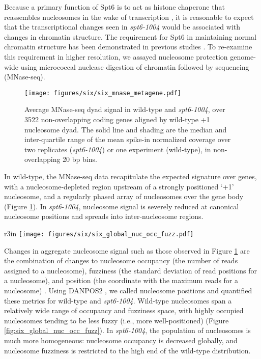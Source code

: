 Because a primary function of Spt6 is to act as histone chaperone that reassembles nucleosomes in the wake of transcription \citep{duina2011}, it is reasonable to expect that the transcriptional changes seen in \textit{spt6-1004} would be associated with changes in chromatin structure.
The requirement for Spt6 in maintaining normal chromatin structure has been demonstrated in previous studies \citep{bortvin1996, ivanovska2011, jeronimo2015, kaplan2003, perales2013, vanbakel2013, degennaro2013}.
To re-examine this requirement in higher resolution, we assayed nucleosome protection genome-wide using micrococcal nuclease digestion of chromatin followed by sequencing (MNase-seq).
\begin{figure}[h]
    \centering
    \texttt{[image: figures/six/six\_mnase\_metagene.pdf]}
    \caption[Average MNase-seq dyad signal in wild-type and \textit{spt6-1004}, over non-overlapping genes aligned by wild-type +1 nucleosome dyad.]{Average MNase-seq dyad signal in wild-type and \textit{spt6-1004}, over 3522 non-overlapping coding genes aligned by wild-type +1 nucleosome dyad. The solid line and shading are the median and inter-quartile range of the mean spike-in normalized coverage over two replicates (\textit{spt6-1004}) or one experiment (wild-type), in non-overlapping 20 bp bins.}
    \label{fig:six_mnase_metagene}
\end{figure}

In wild-type, the MNase-seq data recapitulate the expected signature over genes, with a nucleosome-depleted region upstream of a strongly positioned `+1' nucleosome, and a regularly phased array of nucleosomes over the gene body (Figure \ref{fig:six_mnase_metagene}).
In \textit{spt6-1004}, nucleosome signal is severely reduced at canonical nucleosome positions and spreads into inter-nucleosome regions.

\begin{wrapfigure}[10]{r}{3in}
    \centering
    \texttt{[image: figures/six/six\_global\_nuc\_occ\_fuzz.pdf]}
    \caption[Contour plot of nucleosome occupancy and fuzziness in wild-type and \textit{spt6-1004}.]{Contour plot of the distribution of nucleosome occupancy and fuzziness in wild-type and \textit{spt6-1004}. Dashed lines indicate median values.}
    \label{fig:six_global_nuc_occ_fuzz}
\end{wrapfigure}
Changes in aggregate nucleosome signal such as those observed in Figure \ref{fig:six_mnase_metagene} are the combination of changes to nucleosome occupancy (the number of reads assigned to a nucleosome), fuzziness (the standard deviation of read positions for a nucleosome), and position (the coordinate with the maximum reads for a nucleosome) \citep{chen2013}.
Using DANPOS2 \citep{chen2013}, we called nucleosome positions and quantified these metrics for wild-type and \textit{spt6-1004}.
Wild-type nucleosomes span a relatively wide range of occupancy and fuzziness space, with highly occupied nucleosomes tending to be less fuzzy (i.e., more well-positioned) (Figure \ref{fig:six_global_nuc_occ_fuzz}).
In \textit{spt6-1004}, the population of nucleosomes is much more homogeneous: nucleosome occupancy is decreased globally, and nucleosome fuzziness is restricted to the high end of the wild-type distribution.

